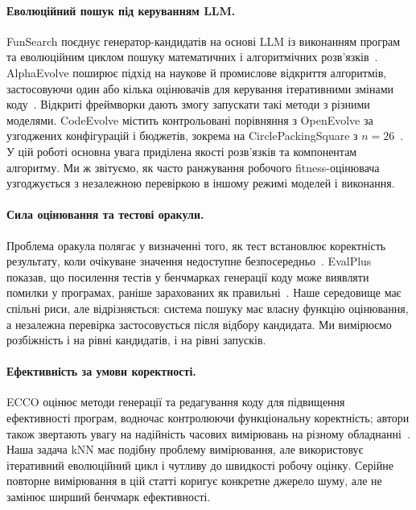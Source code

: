 \documentclass[11pt]{article}
\begin{document}
\paragraph{Еволюційний пошук під керуванням LLM.} FunSearch поєднує генератор-кандидатів на основі LLM із виконанням програм та еволюційним циклом пошуку математичних і алгоритмічних розв'язків~\citep{romera2024funsearch}. AlphaEvolve поширює підхід на наукове й промислове відкриття алгоритмів, застосовуючи один або кілька оцінювачів для керування ітеративними змінами коду~\citep{novikov2025alphaevolve}. Відкриті фреймворки дають змогу запускати такі методи з різними моделями. CodeEvolve містить контрольовані порівняння з OpenEvolve за узгоджених конфігурацій і бюджетів, зокрема на CirclePackingSquare з $n=26$~\citep{assumpcao2025codeevolve}. У цій роботі основна увага приділена якості розв'язків та компонентам алгоритму. Ми ж звітуємо, як часто ранжування робочого fitness-оцінювача узгоджується з незалежною перевіркою в іншому режимі моделей і виконання.

\paragraph{Сила оцінювання та тестові оракули.} Проблема оракула полягає у визначенні того, як тест встановлює коректність результату, коли очікуване значення недоступне безпосередньо~\citep{barr2015oracle}. EvalPlus показав, що посилення тестів у бенчмарках генерації коду може виявляти помилки у програмах, раніше зарахованих як правильні~\citep{liu2023evalplus}. Наше середовище має спільні риси, але відрізняється: система пошуку має власну функцію оцінювання, а незалежна перевірка застосовується після відбору кандидата. Ми вимірюємо розбіжність і на рівні кандидатів, і на рівні запусків.

\paragraph{Ефективність за умови коректності.} ECCO оцінює методи генерації та редагування коду для підвищення ефективності програм, водночас контролюючи функціональну коректність; автори також звертають увагу на надійність часових вимірювань на різному обладнанні~\citep{waghjale2024ecco}. Наша задача kNN має подібну проблему вимірювання, але використовує ітеративний еволюційний цикл і чутливу до швидкості робочу оцінку. Серійне повторне вимірювання в цій статті коригує конкретне джерело шуму, але не замінює ширший бенчмарк ефективності.
\end{document}
